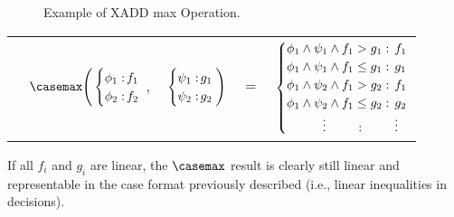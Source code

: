 \begin{figure}[h!t]
\center
{}
\caption{ Example of XADD max Operation.}
\label{fig:xaddmax} 
\end{figure}


\vspace{-5mm}
{\footnotesize
\begin{center}
\begin{tabular}{r c c c l}
&
\hspace{-7mm} $\casemax \Bigg(
  \begin{cases}
    \phi_1: \hspace{-2mm} & \hspace{-1mm} f_1 \\ 
    \phi_2: \hspace{-2mm} & \hspace{-1mm} f_2 \\ 
  \end{cases}$
$,$
&
\hspace{-4mm}
  $\begin{cases}
    \psi_1: \hspace{-2mm} & \hspace{-1mm} g_1 \\ 
    \psi_2: \hspace{-2mm} & \hspace{-1mm} g_2 \\ 
  \end{cases} \Bigg)$
&
\hspace{-4mm} 
$ = $
&
\hspace{-4mm}
  $\begin{cases}
  \phi_1 \wedge \psi_1 \wedge f_1 > g_1    : & \hspace{-2mm} f_1 \\ 
  \phi_1 \wedge \psi_1 \wedge f_1 \leq g_1 : & \hspace{-2mm} g_1 \\ 
  \phi_1 \wedge \psi_2 \wedge f_1 > g_2    : & \hspace{-2mm}f_1 \\ 
  \phi_1 \wedge \psi_2 \wedge f_1 \leq g_2 : & \hspace{-2mm} g_2 \\ 
  \hspace{1cm}\vdots \hspace{8mm}: & \hspace{-2mm} \vdots
  \end{cases}$
\end{tabular}
\end{center}
\vspace{-3mm}
} If all $f_i$ and $g_i$ are linear,
the $\casemax$ result is clearly still linear and representable in the case format previously described (i.e., linear inequalities in decisions).

